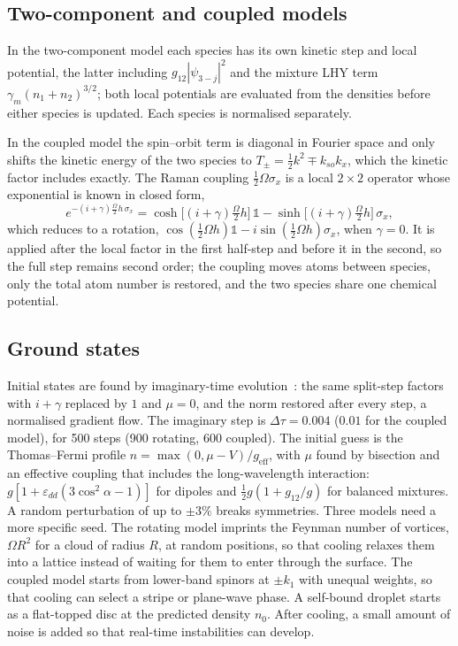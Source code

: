 \documentclass[11pt,a4paper]{article}
\begin{document}
\subsection{Two-component and coupled models}

In the two-component model each species has its own kinetic step and local potential, the latter including $g_{12}|\psi_{3-j}|^2$ and the mixture LHY term $\gamma_m(n_1+n_2)^{3/2}$; both local potentials are evaluated from the densities before either species is updated. Each species is normalised separately.

In the coupled model the spin--orbit term is diagonal in Fourier space and only shifts the kinetic energy of the two species to $T_\pm=\tfrac12k^2\mp k_{so}k_x$, which the kinetic factor includes exactly. The Raman coupling $\tfrac12\Omega\sigma_x$ is a local $2\times2$ operator whose exponential is known in closed form,
\begin{equation}
e^{-(i+\gamma)\frac{\Omega}{2}h\,\sigma_x}=\cosh\bigl[(i+\gamma)\tfrac{\Omega}{2}h\bigr]\,\mathds{1}-\sinh\bigl[(i+\gamma)\tfrac{\Omega}{2}h\bigr]\,\sigma_x ,
\end{equation}
which reduces to a rotation, $\cos(\tfrac12\Omega h)\mathds{1}-i\sin(\tfrac12\Omega h)\sigma_x$, when $\gamma=0$. It is applied after the local factor in the first half-step and before it in the second, so the full step remains second order; the coupling moves atoms between species, only the total atom number is restored, and the two species share one chemical potential.

\subsection{Ground states}

Initial states are found by imaginary-time evolution~\cite{chiofalo}: the same split-step factors with $i+\gamma$ replaced by $1$ and $\mu=0$, and the norm restored after every step, a normalised gradient flow. The imaginary step is $\Delta\tau=0.004$ ($0.01$ for the coupled model), for 500 steps (900 rotating, 600 coupled). The initial guess is the Thomas--Fermi profile $n=\max(0,\mu-V)/g_{\mathrm{eff}}$, with $\mu$ found by bisection and an effective coupling that includes the long-wavelength interaction: $g[1+\varepsilon_{dd}(3\cos^2\alpha-1)]$ for dipoles and $\tfrac12g(1+g_{12}/g)$ for balanced mixtures. A random perturbation of up to $\pm3\%$ breaks symmetries. Three models need a more specific seed. The rotating model imprints the Feynman number of vortices, $\Omega R^2$ for a cloud of radius $R$, at random positions, so that cooling relaxes them into a lattice instead of waiting for them to enter through the surface. The coupled model starts from lower-band spinors at $\pm k_1$ with unequal weights, so that cooling can select a stripe or plane-wave phase. A self-bound droplet starts as a flat-topped disc at the predicted density $n_0$. After cooling, a small amount of noise is added so that real-time instabilities can develop.
\end{document}
